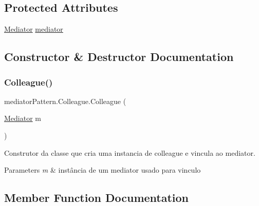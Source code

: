 \subsection*{Protected Attributes}
\begin{DoxyCompactItemize}
\item 
\mbox{\hyperlink{interfacemediator_pattern_1_1_mediator}{Mediator}} \mbox{\hyperlink{classmediator_pattern_1_1_colleague_a2c5e9bbff6e49aca728d19fb3daf2aa1}{mediator}}
\end{DoxyCompactItemize}


\subsection{Constructor \& Destructor Documentation}
\mbox{\label{classmediator_pattern_1_1_colleague_aa6743736562c0696099805ce69329856}} 
\subsubsection{\texorpdfstring{Colleague()}{Colleague()}}
{\footnotesize\ttfamily mediator\+Pattern.\+Colleague.\+Colleague (\begin{DoxyParamCaption}\item[{\mbox{\hyperlink{interfacemediator_pattern_1_1_mediator}{Mediator}}}]{m }\end{DoxyParamCaption})}



Construtor da classe que cria uma instancia de colleague e vincula ao mediator. 


\begin{DoxyParams}{Parameters}
{\em m} & instância de um mediator usado para vinculo \\
\hline
\end{DoxyParams}


\subsection{Member Function Documentation}
\mbox{\label{classmediator_pattern_1_1_colleague_ab5fad1a9bc7ea337570d9da6f795731f}} 
